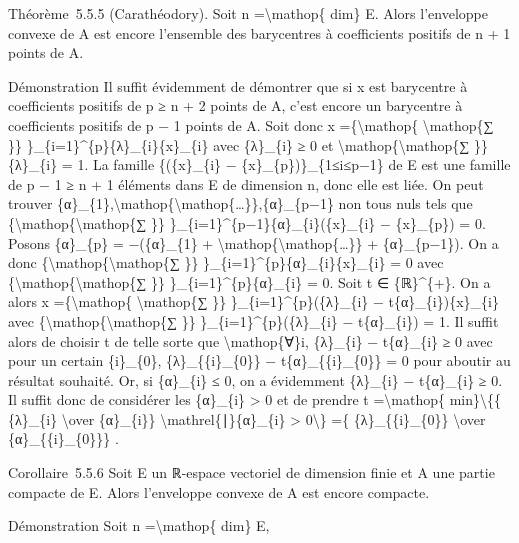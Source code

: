 \documentclass[]{article}
\begin{document}
Théorème~5.5.5 (Carathéodory). Soit n =\textbackslash{}mathop\{ dim\} E.
Alors l'enveloppe convexe de A est encore l'ensemble des barycentres à
coefficients positifs de n + 1 points de A.

Démonstration Il suffit évidemment de démontrer que si x est barycentre
à coefficients positifs de p ≥ n + 2 points de A, c'est encore un
barycentre à coefficients positifs de p − 1 points de A. Soit donc x
=\{\textbackslash{}mathop\{ \textbackslash{}mathop\{∑ \}\}
\}\_\{i=1\}\^{}\{p\}\{λ\}\_\{i\}\{x\}\_\{i\} avec \{λ\}\_\{i\} ≥ 0 et
\textbackslash{}mathop\{\textbackslash{}mathop\{∑ \}\} \{λ\}\_\{i\} = 1.
La famille \{(\{x\}\_\{i\} − \{x\}\_\{p\})\}\_\{1≤i≤p−1\} de E est une
famille de p − 1 ≥ n + 1 éléments dans E de dimension n, donc elle est
liée. On peut trouver
\{α\}\_\{1\},\textbackslash{}mathop\{\textbackslash{}mathop\{\ldots{}\}\},\{α\}\_\{p−1\}
non tous nuls tels que
\{\textbackslash{}mathop\{\textbackslash{}mathop\{∑ \}\}
\}\_\{i=1\}\^{}\{p−1\}\{α\}\_\{i\}(\{x\}\_\{i\} − \{x\}\_\{p\}) = 0.
Posons \{α\}\_\{p\} = −(\{α\}\_\{1\} +
\textbackslash{}mathop\{\textbackslash{}mathop\{\ldots{}\}\} +
\{α\}\_\{p−1\}). On a donc
\{\textbackslash{}mathop\{\textbackslash{}mathop\{∑ \}\}
\}\_\{i=1\}\^{}\{p\}\{α\}\_\{i\}\{x\}\_\{i\} = 0 avec
\{\textbackslash{}mathop\{\textbackslash{}mathop\{∑ \}\}
\}\_\{i=1\}\^{}\{p\}\{α\}\_\{i\} = 0. Soit t ∈ \{ℝ\}\^{}\{+\}. On a
alors x =\{\textbackslash{}mathop\{ \textbackslash{}mathop\{∑ \}\}
\}\_\{i=1\}\^{}\{p\}(\{λ\}\_\{i\} − t\{α\}\_\{i\})\{x\}\_\{i\} avec
\{\textbackslash{}mathop\{\textbackslash{}mathop\{∑ \}\}
\}\_\{i=1\}\^{}\{p\}(\{λ\}\_\{i\} − t\{α\}\_\{i\}) = 1. Il suffit alors
de choisir t de telle sorte que \textbackslash{}mathop\{∀\}i,
\{λ\}\_\{i\} − t\{α\}\_\{i\} ≥ 0 avec pour un certain \{i\}\_\{0\},
\{λ\}\_\{\{i\}\_\{0\}\} − t\{α\}\_\{\{i\}\_\{0\}\} = 0 pour aboutir au
résultat souhaité. Or, si \{α\}\_\{i\} ≤ 0, on a évidemment \{λ\}\_\{i\}
− t\{α\}\_\{i\} ≥ 0. Il suffit donc de considérer les \{α\}\_\{i\}
\textgreater{} 0 et de prendre t =\textbackslash{}mathop\{
min\}\textbackslash{}\{\{ \{λ\}\_\{i\} \textbackslash{}over
\{α\}\_\{i\}\} \textbackslash{}mathrel\{∣\}\{α\}\_\{i\} \textgreater{}
0\textbackslash{}\} =\{ \{λ\}\_\{\{i\}\_\{0\}\} \textbackslash{}over
\{α\}\_\{\{i\}\_\{0\}\}\} .

Corollaire~5.5.6 Soit E un ℝ-espace vectoriel de dimension finie et A
une partie compacte de E. Alors l'enveloppe convexe de A est encore
compacte.

Démonstration Soit n =\textbackslash{}mathop\{ dim\} E,
\end{document}
